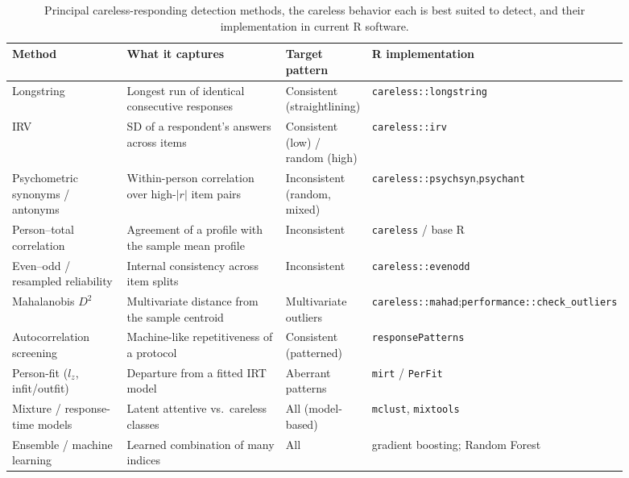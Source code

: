 \begin{table}[t]
\centering
\caption{Principal careless-responding detection methods, the careless
behavior each is best suited to detect, and their implementation in current
\textsf{R} software.}
\label{tab:indices}
\footnotesize
\begin{tabular}{L{0.20\linewidth} L{0.30\linewidth} L{0.14\linewidth} L{0.25\linewidth}}
\toprule
\textbf{Method} & \textbf{What it captures} & \textbf{Target pattern} & \textbf{R implementation} \\
\midrule
Longstring & Longest run of identical consecutive responses & Consistent (straightlining) & \texttt{careless::\allowbreak longstring} \\
IRV & SD of a respondent's answers across items & Consistent (low) / random (high) & \texttt{careless::\allowbreak irv} \\
Psychometric synonyms / antonyms & Within-person correlation over high-$|r|$ item pairs & Inconsistent (random, mixed) & \texttt{careless::\allowbreak psychsyn},\newline \texttt{psychant} \\
Person--total correlation & Agreement of a profile with the sample mean profile & Inconsistent & \texttt{careless} / base \textsf{R} \\
Even--odd / resampled reliability & Internal consistency across item splits & Inconsistent & \texttt{careless::\allowbreak evenodd} \\
Mahalanobis $D^2$ & Multivariate distance from the sample centroid & Multivariate outliers & \texttt{careless::\allowbreak mahad};\newline \texttt{performance::\allowbreak check\_outliers} \\
Autocorrelation screening & Machine-like repetitiveness of a protocol & Consistent (patterned) & \texttt{responsePatterns} \\
Person-fit ($l_z$, infit/outfit) & Departure from a fitted IRT model & Aberrant patterns & \texttt{mirt} / \texttt{PerFit} \\
Mixture / response-time models & Latent attentive vs.\ careless classes & All (model-based) & \texttt{mclust}, \texttt{mixtools} \\
Ensemble / machine learning & Learned combination of many indices & All & gradient boosting; Random Forest \\
\bottomrule
\end{tabular}
\end{table}


